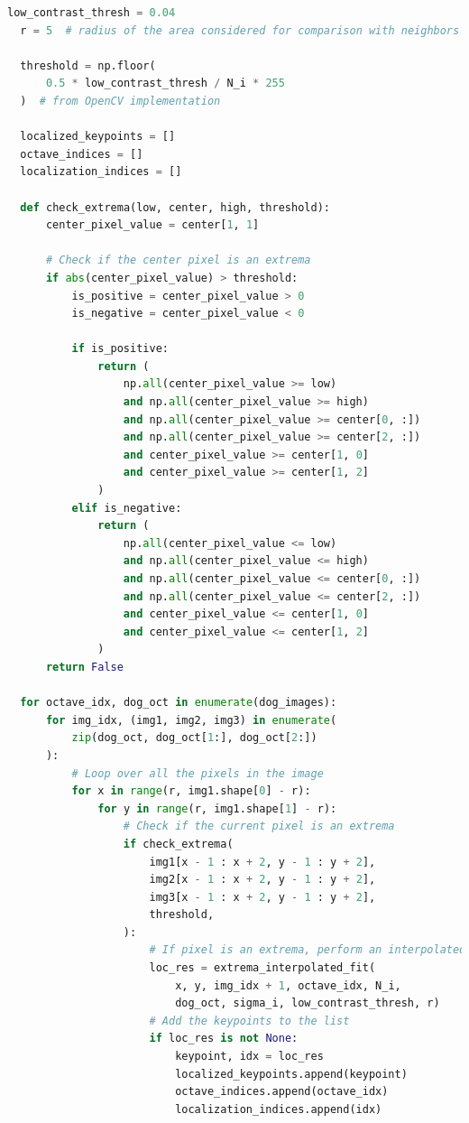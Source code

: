 \documentclass[11pt,a4paper]{article}
\begin{document}
\begin{lstlisting}[language=Python, caption=Keypoint localization]
  low_contrast_thresh = 0.04
  r = 5  # radius of the area considered for comparison with neighbors

  threshold = np.floor(
      0.5 * low_contrast_thresh / N_i * 255
  )  # from OpenCV implementation

  localized_keypoints = []
  octave_indices = []
  localization_indices = []

  def check_extrema(low, center, high, threshold):
      center_pixel_value = center[1, 1]

      # Check if the center pixel is an extrema
      if abs(center_pixel_value) > threshold:
          is_positive = center_pixel_value > 0
          is_negative = center_pixel_value < 0

          if is_positive:
              return (
                  np.all(center_pixel_value >= low)
                  and np.all(center_pixel_value >= high)
                  and np.all(center_pixel_value >= center[0, :])
                  and np.all(center_pixel_value >= center[2, :])
                  and center_pixel_value >= center[1, 0]
                  and center_pixel_value >= center[1, 2]
              )
          elif is_negative:
              return (
                  np.all(center_pixel_value <= low)
                  and np.all(center_pixel_value <= high)
                  and np.all(center_pixel_value <= center[0, :])
                  and np.all(center_pixel_value <= center[2, :])
                  and center_pixel_value <= center[1, 0]
                  and center_pixel_value <= center[1, 2]
              )
      return False

  for octave_idx, dog_oct in enumerate(dog_images):
      for img_idx, (img1, img2, img3) in enumerate(
          zip(dog_oct, dog_oct[1:], dog_oct[2:])
      ):
          # Loop over all the pixels in the image
          for x in range(r, img1.shape[0] - r):
              for y in range(r, img1.shape[1] - r):
                  # Check if the current pixel is an extrema
                  if check_extrema(
                      img1[x - 1 : x + 2, y - 1 : y + 2],
                      img2[x - 1 : x + 2, y - 1 : y + 2],
                      img3[x - 1 : x + 2, y - 1 : y + 2],
                      threshold,
                  ):
                      # If pixel is an extrema, perform an interpolated fit
                      loc_res = extrema_interpolated_fit(
                          x, y, img_idx + 1, octave_idx, N_i,
                          dog_oct, sigma_i, low_contrast_thresh, r)
                      # Add the keypoints to the list
                      if loc_res is not None:
                          keypoint, idx = loc_res
                          localized_keypoints.append(keypoint)
                          octave_indices.append(octave_idx)
                          localization_indices.append(idx)


\end{lstlisting}
\end{document}
